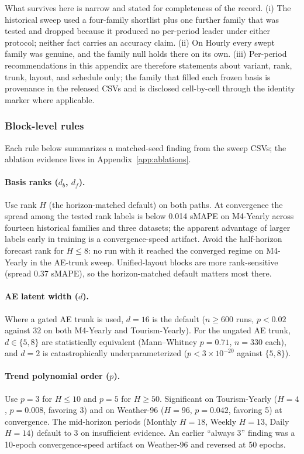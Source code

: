 What survives here is narrow and stated for completeness of the record.
(i) The historical sweep used a four-family shortlist plus one further
family that was tested and dropped because it produced no per-period leader
under either protocol; neither fact carries an accuracy claim.
(ii) On Hourly every swept family was genuine, and the family null holds
there on its own. (iii) Per-period recommendations in this appendix are
therefore statements about variant, rank, trunk, layout, and schedule only;
the family that filled each frozen basis is provenance in the released CSVs
and is disclosed cell-by-cell through the identity marker where applicable.

\subsubsection{Block-level rules}
\label{app:hyperparams:block}

Each rule below summarizes a matched-seed finding from the sweep CSVs;
the ablation evidence lives in Appendix~\ref{app:ablations}.

\paragraph{Basis ranks ($d_b$, $d_f$).} Use rank $H$ (the horizon-matched
default) on both paths. At convergence the spread among the tested rank
labels is below 0.014 sMAPE on M4-Yearly across fourteen historical
families and three datasets; the apparent advantage of larger labels early
in training is a convergence-speed artifact. Avoid the half-horizon
forecast rank for $H \leq 8$: no run with it reached the converged regime
on M4-Yearly in the AE-trunk sweep. Unified-layout blocks are more
rank-sensitive (spread 0.37 sMAPE), so the horizon-matched default matters
most there.

\paragraph{AE latent width ($d$).} Where a gated AE trunk is used, $d = 16$
is the default ($n \geq 600$ runs, $p < 0.02$ against $32$ on both
M4-Yearly and Tourism-Yearly). For the ungated AE trunk, $d \in \{5, 8\}$
are statistically equivalent (Mann--Whitney $p = 0.71$, $n = 330$ each),
and $d = 2$ is catastrophically underparameterized
($p < 3 \times 10^{-20}$ against $\{5, 8\}$).

\paragraph{Trend polynomial order ($p$).} Use $p = 3$ for $H \leq 10$ and
$p = 5$ for $H \geq 50$. Significant on Tourism-Yearly ($H = 4$,
$p = 0.008$, favoring 3) and on Weather-96 ($H = 96$, $p = 0.042$,
favoring 5) at convergence. The mid-horizon periods (Monthly $H = 18$,
Weekly $H = 13$, Daily $H = 14$) default to 3 on insufficient evidence. An
earlier ``always 3'' finding was a 10-epoch convergence-speed artifact on
Weather-96 and reversed at 50 epochs.


